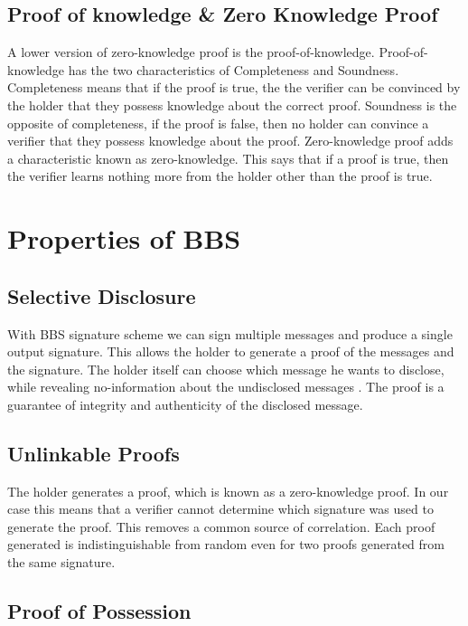 \documentclass{article}
\begin{document}
\subsection{Proof of knowledge \& Zero Knowledge Proof}

A lower version of zero-knowledge proof is the proof-of-knowledge. Proof-of-knowledge has the two characteristics of Completeness and Soundness. Completeness means that if the proof is true, the the verifier can be convinced by the holder that they possess knowledge about the correct proof. Soundness is the opposite of completeness, if the proof is false, then no holder can convince a verifier that they possess knowledge about the proof. Zero-knowledge proof adds a characteristic known as zero-knowledge. This says that if a proof is true, then the verifier learns nothing more from the holder other than the proof is true.


\section{Properties of BBS}

\subsection{Selective Disclosure}

With BBS signature scheme we can sign multiple messages and produce a single output signature. This allows the holder to generate a proof of the messages and the signature. The holder itself can choose which message he wants to disclose, while revealing no-information about the undisclosed messages . The proof is a guarantee of integrity and authenticity of the disclosed message.

\subsection{Unlinkable Proofs}

The holder generates a proof, which is known as a zero-knowledge proof. In our case this means that a verifier cannot determine which signature was used to generate the proof. This removes a common source of correlation. Each proof generated is indistinguishable from random even for two proofs generated from the same signature. 

\subsection{Proof of Possession}
\end{document}
